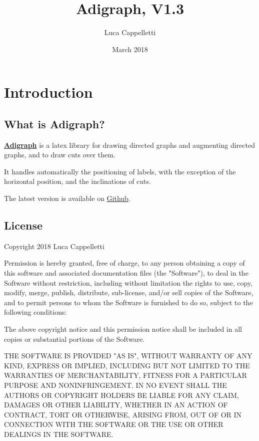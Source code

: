\documentclass{report}
\title{Adigraph, V1.3}
\author{Luca Cappelletti}
\date{March 2018}
\begin{document}
\maketitle

{\hypersetup{hidelinks}
	\tableofcontents  %
}

\chapter{Introduction}
\section{What is Adigraph?}
\textbf{\href{https://ctan.org/pkg/adigraph}{Adigraph}} is a latex library for drawing directed graphs and augmenting directed graphs, and to draw cuts over them.

It handles automatically the positioning of labels, with the exception of the horizontal position, and the inclinations of cuts.

The latest version is available on \href{https://github.com/LucaCappelletti94/adigraph}{Github}.

\section{License}
Copyright 2018 Luca Cappelletti

Permission is hereby granted, free of charge, to any person obtaining a copy of this software and associated documentation files (the "Software"), to deal in the Software without restriction, including without limitation the rights to use, copy, modify, merge, publish, distribute, sub-license, and/or sell copies of the Software, and to permit persons to whom the Software is furnished to do so, subject to the following conditions:

The above copyright notice and this permission notice shall be included in all copies or substantial portions of the Software.

THE SOFTWARE IS PROVIDED "AS IS", WITHOUT WARRANTY OF ANY KIND, EXPRESS OR IMPLIED, INCLUDING BUT NOT LIMITED TO THE WARRANTIES OF MERCHANTABILITY, FITNESS FOR A PARTICULAR PURPOSE AND NONINFRINGEMENT. IN NO EVENT SHALL THE AUTHORS OR COPYRIGHT HOLDERS BE LIABLE FOR ANY CLAIM, DAMAGES OR OTHER LIABILITY, WHETHER IN AN ACTION OF CONTRACT, TORT OR OTHERWISE, ARISING FROM, OUT OF OR IN CONNECTION WITH THE SOFTWARE OR THE USE OR OTHER DEALINGS IN THE SOFTWARE.\\
\end{document}
